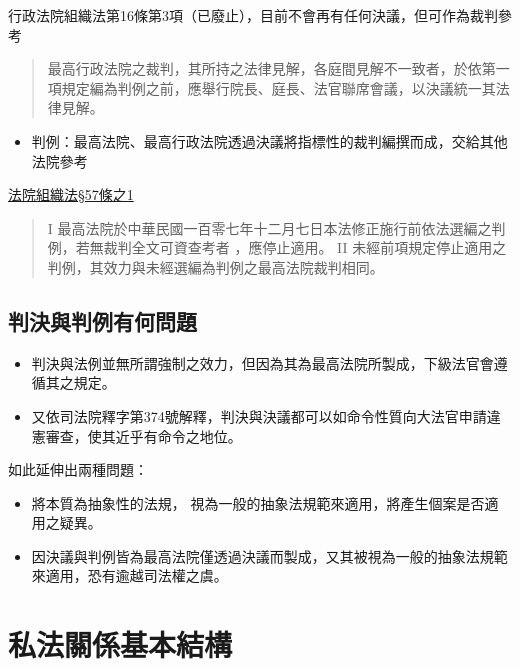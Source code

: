 \documentclass[
]{book}
\providecommand{\tightlist}{%
  \setlength{\itemsep}{0pt}\setlength{\parskip}{0pt}}
\begin{document}
行政法院組織法第16條第3項（已廢止），目前不會再有任何決議，但可作為裁判參考

\begin{quote}
最高行政法院之裁判，其所持之法律見解，各庭間見解不一致者，於依第一項規定編為判例之前，應舉行院長、庭長、法官聯席會議，以決議統一其法律見解。
\end{quote}

\begin{itemize}
\tightlist
\item
  判例：最高法院、最高行政法院透過決議將指標性的裁判編撰而成，交給其他法院參考
\end{itemize}

\href{https://law.moj.gov.tw/LawClass/LawSingle.aspx?pcode=A0010053\&flno=57-1}{法院組織法§57條之1}

\begin{quote}
I 最高法院於中華⺠國一百零七年十二月七日本法修正施行前依法選編之判例，若無裁判全文可資查考者 ，應停止適用。
II 未經前項規定停止適用之判例，其效力與未經選編為判例之最高法院裁判相同。
\end{quote}

\hypertarget{ux5224ux6c7aux8207ux5224ux4f8bux6709ux4f55ux554fux984c}{%
\subsection{判決與判例有何問題}\label{ux5224ux6c7aux8207ux5224ux4f8bux6709ux4f55ux554fux984c}}

\begin{itemize}
\item
  判決與法例並無所謂強制之效力，但因為其為最高法院所製成，下級法官會遵循其之規定。
\item
  又依司法院釋字第374號解釋，判決與決議都可以如命令性質向大法官申請違憲審查，使其近乎有命令之地位。
\end{itemize}

如此延伸出兩種問題：

\begin{itemize}
\item
  將本質為抽象性的法規， 視為一般的抽象法規範來適用，將產生個案是否適用之疑異。
\item
  因決議與判例皆為最高法院僅透過決議而製成，又其被視為一般的抽象法規範來適用，恐有逾越司法權之虞。
\end{itemize}

\pagebreak

\hypertarget{ux79c1ux6cd5ux95dcux4fc2ux57faux672cux7d50ux69cb}{%
\section{私法關係基本結構}\label{ux79c1ux6cd5ux95dcux4fc2ux57faux672cux7d50ux69cb}}
\end{document}
